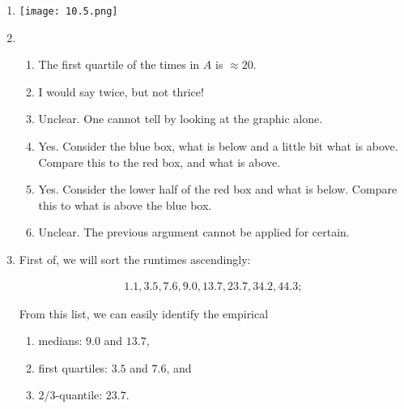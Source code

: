 
\begin{solution}

\phantom{}

\begin{enumerate}[label = (\alph*)]

    \item \phantom{}

    \begin{center}
        \texttt{[image: 10.5.png]}        
    \end{center}

    

    \item

    \begin{enumerate}[label = (\alph*)]

        \item The first quartile of the times in $A$ is $\approx 20$.

        \item I would say twice, but not thrice!

        \item Unclear.
        One cannot tell by looking at the graphic alone.

        \item Yes.
        Consider the blue box, what is below and a little bit what is above.
        Compare this to the red box, and what is above.

        \item Yes.
        Consider the lower half of the red box and what is below.
        Compare this to what is above the blue box.

        \item Unclear.
        The previous argument cannot be applied for certain.

    \end{enumerate}

    \item First of, we will sort the runtimes ascendingly:
    
    \begin{align*}
        1.1, 3.5, 7.6, 9.0, 13.7, 23.7, 34.2, 44.3;
    \end{align*} 

    From this list, we can easily identify the empirical
    
    \begin{enumerate}
        \item medians: $9.0$ and $13.7$,
        \item first quartiles: $3.5$ and $7.6$, and
        \item $2/3$-quantile: $23.7$.
    \end{enumerate}

\end{enumerate}

\end{solution}

